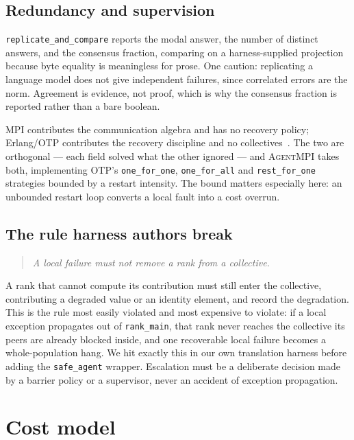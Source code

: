 \documentclass[10pt,twocolumn]{article}
\theoremstyle{definition}
\theoremstyle{plain}
\newcommand{\ampi}{\textsc{AgentMPI}}
\newcommand{\code}[1]{\texttt{\small #1}}
\begin{document}
\subsection{Redundancy and supervision}

\code{replicate\_and\_compare} reports the modal answer, the number of distinct
answers, and the consensus fraction, comparing on a harness-supplied projection
because byte equality is meaningless for prose. One caution: replicating a language
model does not give independent failures, since correlated errors are the norm.
Agreement is evidence, not proof, which is why the consensus fraction is reported
rather than a bare boolean.

MPI contributes the communication algebra and has no recovery policy; Erlang/OTP
contributes the recovery discipline and no collectives~\cite{armstrong03erlang}. The
two are orthogonal --- each field solved what the other ignored --- and \ampi{}
takes both, implementing OTP's \code{one\_for\_one}, \code{one\_for\_all} and
\code{rest\_for\_one} strategies bounded by a restart intensity. The bound matters
especially here: an unbounded restart loop converts a local fault into a cost
overrun.

\subsection{The rule harness authors break}

\begin{quote}
\emph{A local failure must not remove a rank from a collective.}
\end{quote}

A rank that cannot compute its contribution must still enter the collective,
contributing a degraded value or an identity element, and record the degradation.
This is the rule most easily violated and most expensive to violate: if a local
exception propagates out of \code{rank\_main}, that rank never reaches the
collective its peers are already blocked inside, and one recoverable local failure
becomes a whole-population hang. We hit exactly this in our own translation harness
before adding the \code{safe\_agent} wrapper. Escalation must be a deliberate
decision made by a barrier policy or a supervisor, never an accident of exception
propagation.

\section{Cost model}
\label{sec:cost}
\end{document}
